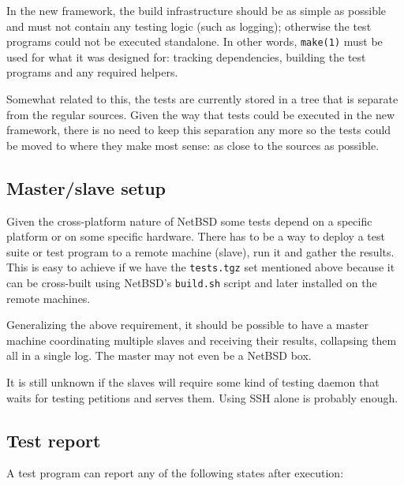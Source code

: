 \documentclass[a4paper,10pt]{article}
\begin{document}
In the new framework, the build infrastructure should be as simple as
possible and must not contain any testing logic (such as logging);
otherwise the test programs could not be executed standalone.  In other
words, \verb*|make(1)| must be used for what it was designed for: tracking
dependencies, building the test programs and any required helpers.

Somewhat related to this, the tests are currently stored in a tree that is
separate from the regular sources.  Given the way that tests could be
executed in the new framework, there is no need to keep this separation
any more so the tests could be moved to where they make most sense: as
close to the sources as possible.


\subsection{Master/slave setup}
\label{sec:master_slave}

Given the cross-platform nature of NetBSD some tests depend on a specific
platform or on some specific hardware.  There has to be a way to deploy a
test suite or test program to a remote machine (slave), run it and gather
the results.  This is easy to achieve if we have the \verb*|tests.tgz| set
mentioned above because it can be cross-built using NetBSD's
\verb*|build.sh| script and later installed on the remote machines.

Generalizing the above requirement, it should be possible to have a master
machine coordinating multiple slaves and receiving their results,
collapsing them all in a single log.  The master may not even be a NetBSD
box.

It is still unknown if the slaves will require some kind of testing daemon
that waits for testing petitions and serves them.  Using SSH alone is
probably enough.


\subsection{Test report}

A test program can report any of the following states after execution:
\end{document}
